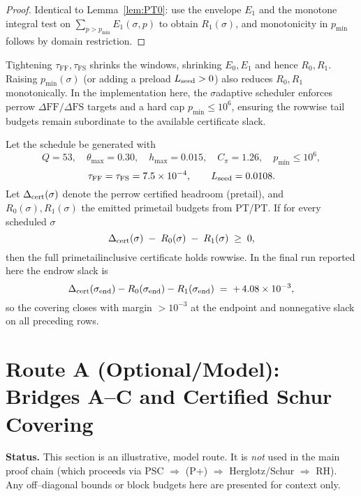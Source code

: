\documentclass[11pt]{article}
\theoremstyle{definition}
\theoremstyle{remark}
\begin{document}
\begin{proof}
Identical to Lemma~\ref{lem:PT0}: use the envelope $E_1$ and the monotone integral test on $\sum_{p>p_{\min}} E_1(\sigma,p)$ to obtain $R_1(\sigma)$, and monotonicity in $p_{\min}$ follows by domain restriction.
\end{proof}
\begin{ptremark}
Tightening $\tau_{\mathrm{FF}},\tau_{\mathrm{FS}}$ shrinks the windows,
shrinking $E_0,E_1$ and hence $R_0,R_1$. Raising $p_{\min}(\sigma)$
(or adding a preload $L_{\rm seed}>0$) also reduces $R_0,R_1$ monotonically.
In the implementation here, the $\sigma$\textendash adaptive scheduler enforces
per\textendash row $\Delta\mathrm{FF}/\Delta\mathrm{FS}$ targets and a hard cap
$p_{\min}\le10^{6}$, ensuring the row\textendash wise tail budgets remain subordinate
to the available certificate slack.
\end{ptremark}
\begin{ptcor}\label{cor:PT-certificate}
Let the schedule be generated with
\[
Q=53,\quad \theta_{\max}=0.30,\quad h_{\max}=0.015,\quad
C_{\pi}=1.26,\quad p_{\min}\le 10^{6},
\]
\[
\tau_{\mathrm{FF}}=\tau_{\mathrm{FS}}=7.5\times10^{-4},\qquad
L_{\rm seed}=0.0108.
\]
Let $\Delta_{\rm cert}(\sigma)$ denote the per\textendash row certified headroom
(pre\textendash tail), and $R_{0}(\sigma),R_{1}(\sigma)$ the emitted prime\textendash tail
budgets from PT/PT. If for every scheduled $\sigma$
\[
\Delta_{\rm cert}(\sigma)\;-
\;R_{0}(\sigma)\;-
\;R_{1}(\sigma)\;\ge\;0,
\]
then the full prime\textendash tail\textendash inclusive certificate holds row\textendash wise.
In the final run reported here the end\textendash row slack is
\[
\Delta_{\rm cert}(\sigma_{\rm end})-R_{0}(\sigma_{\rm end})-R_{1}(\sigma_{\rm end})
\;=\; +\,4.08\times10^{-3},
\]
so the covering closes with margin $>\!10^{-3}$ at the endpoint and
non\textendash negative slack on all preceding rows.
\end{ptcor}
\section*{Route A (Optional/Model): Bridges A--C and Certified Schur Covering}
\noindent\textbf{Status.} This section is an illustrative, model route. It is \emph{not} used in the main proof chain (which proceeds via PSC $\Rightarrow$ (P+) $\Rightarrow$ Herglotz/Schur $\Rightarrow$ RH). Any off--diagonal bounds or block budgets here are presented for context only.
\end{document}
